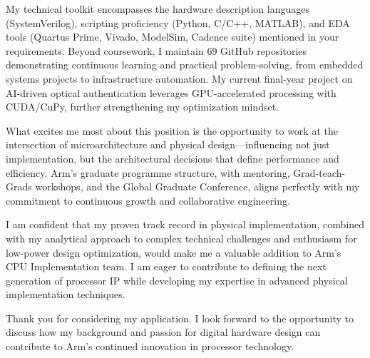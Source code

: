 \documentclass[11pt,a4paper,sans]{moderncv}
\begin{document}
My technical toolkit encompasses the hardware description languages (SystemVerilog), scripting proficiency (Python, C/C++, MATLAB), and EDA tools (Quartus Prime, Vivado, ModelSim, Cadence suite) mentioned in your requirements. Beyond coursework, I maintain 69 GitHub repositories demonstrating continuous learning and practical problem-solving, from embedded systems projects to infrastructure automation. My current final-year project on AI-driven optical authentication leverages GPU-accelerated processing with CUDA/CuPy, further strengthening my optimization mindset.

What excites me most about this position is the opportunity to work at the intersection of microarchitecture and physical design—influencing not just implementation, but the architectural decisions that define performance and efficiency. Arm's graduate programme structure, with mentoring, Grad-teach-Grads workshops, and the Global Graduate Conference, aligns perfectly with my commitment to continuous growth and collaborative engineering.

I am confident that my proven track record in physical implementation, combined with my analytical approach to complex technical challenges and enthusiasm for low-power design optimization, would make me a valuable addition to Arm's CPU Implementation team. I am eager to contribute to defining the next generation of processor IP while developing my expertise in advanced physical implementation techniques.

Thank you for considering my application. I look forward to the opportunity to discuss how my background and passion for digital hardware design can contribute to Arm's continued innovation in processor technology.

\makeletterclosing
\end{document}
